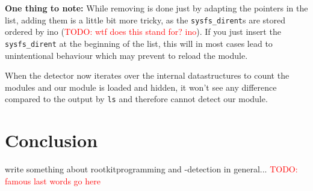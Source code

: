 \documentclass[10pt, letterpaper]{scrartcl}
\newcommand{\todo}[1]{\textcolor{red}{TODO: #1}}
\begin{document}
\textbf{One thing to note:} While removing is done just by adapting the pointers in the list, adding them is a little bit more tricky, as 
the \texttt{sysfs\_dirent}s are stored ordered by ino (\todo{wtf does this stand for? ino}). If you just insert the \texttt{sysfs\_dirent} at the beginning of the list, this will in most cases lead to unintentional behaviour which may prevent to reload the module.

When the detector now iterates over the internal datastructures to count the modules and our module is loaded and hidden, it won't see any difference compared to the output by \texttt{ls} and therefore cannot detect our module.

\section{Conclusion}
write something about rootkitprogramming and -detection in general...
\todo{famous last words go here}
\end{document}
